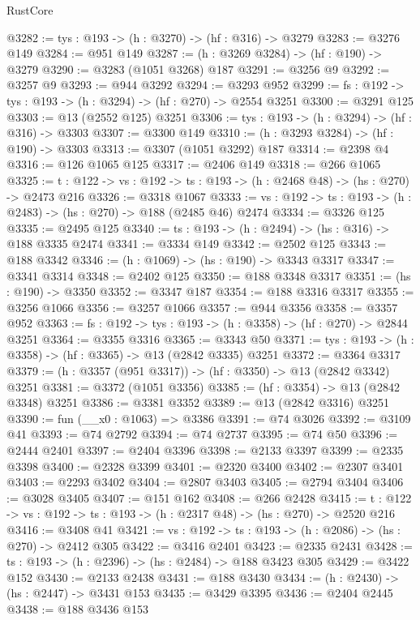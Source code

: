 \begin{lexlean}{RustCore}
\begin{coremodule}
@3282 := {tys : @193} -> (h : @3270) -> (hf : @316) -> @3279
@3283 := @3276 @149
@3284 := @951 @149
@3287 := (h : @3269 @3284) -> (hf : @190) -> @3279
@3290 := @3283 (@1051 @3268) @187
@3291 := @3256 @9
@3292 := @3257 @9
@3293 := @944 @3292
@3294 := @3293 @952
@3299 := {fs : @192} -> {tys : @193} -> (h : @3294) -> (hf : @270) -> @2554 @3251
@3300 := @3291 @125
@3303 := @13 (@2552 @125) @3251
@3306 := {tys : @193} -> (h : @3294) -> (hf : @316) -> @3303
@3307 := @3300 @149
@3310 := (h : @3293 @3284) -> (hf : @190) -> @3303
@3313 := @3307 (@1051 @3292) @187
@3314 := @2398 @4
@3316 := @126 @1065 @125
@3317 := @2406 @149
@3318 := @266 @1065
@3325 := {t : @122} -> {vs : @192} -> {ts : @193} -> (h : @2468 @48) -> (hs : @270) -> @2473 @216
@3326 := @3318 @1067
@3333 := {vs : @192} -> {ts : @193} -> (h : @2483) -> (hs : @270) -> @188 (@2485 @46) @2474
@3334 := @3326 @125
@3335 := @2495 @125
@3340 := {ts : @193} -> (h : @2494) -> (hs : @316) -> @188 @3335 @2474
@3341 := @3334 @149
@3342 := @2502 @125
@3343 := @188 @3342
@3346 := (h : @1069) -> (hs : @190) -> @3343 @3317
@3347 := @3341 @3314
@3348 := @2402 @125
@3350 := @188 @3348 @3317
@3351 := (hs : @190) -> @3350
@3352 := @3347 @187
@3354 := @188 @3316 @3317
@3355 := @3256 @1066
@3356 := @3257 @1066
@3357 := @944 @3356
@3358 := @3357 @952
@3363 := {fs : @192} -> {tys : @193} -> (h : @3358) -> (hf : @270) -> @2844 @3251
@3364 := @3355 @3316
@3365 := @3343 @50
@3371 := {tys : @193} -> (h : @3358) -> (hf : @3365) -> @13 (@2842 @3335) @3251
@3372 := @3364 @3317
@3379 := (h : @3357 (@951 @3317)) -> (hf : @3350) -> @13 (@2842 @3342) @3251
@3381 := @3372 (@1051 @3356)
@3385 := (hf : @3354) -> @13 (@2842 @3348) @3251
@3386 := @3381 @3352
@3389 := @13 (@2842 @3316) @3251
@3390 := fun (__x0 : @1063) => @3386
@3391 := @74 @3026
@3392 := @3109 @41
@3393 := @74 @2792
@3394 := @74 @2737
@3395 := @74 @50
@3396 := @2444 @2401
@3397 := @2404 @3396
@3398 := @2133 @3397
@3399 := @2335 @3398
@3400 := @2328 @3399
@3401 := @2320 @3400
@3402 := @2307 @3401
@3403 := @2293 @3402
@3404 := @2807 @3403
@3405 := @2794 @3404
@3406 := @3028 @3405
@3407 := @151 @162
@3408 := @266 @2428
@3415 := {t : @122} -> {vs : @192} -> {ts : @193} -> (h : @2317 @48) -> (hs : @270) -> @2520 @216
@3416 := @3408 @41
@3421 := {vs : @192} -> {ts : @193} -> (h : @2086) -> (hs : @270) -> @2412 @305
@3422 := @3416 @2401
@3423 := @2335 @2431
@3428 := {ts : @193} -> (h : @2396) -> (hs : @2484) -> @188 @3423 @305
@3429 := @3422 @152
@3430 := @2133 @2438
@3431 := @188 @3430
@3434 := (h : @2430) -> (hs : @2447) -> @3431 @153
@3435 := @3429 @3395
@3436 := @2404 @2445
@3438 := @188 @3436 @153

\end{coremodule}
\end{lexlean}
